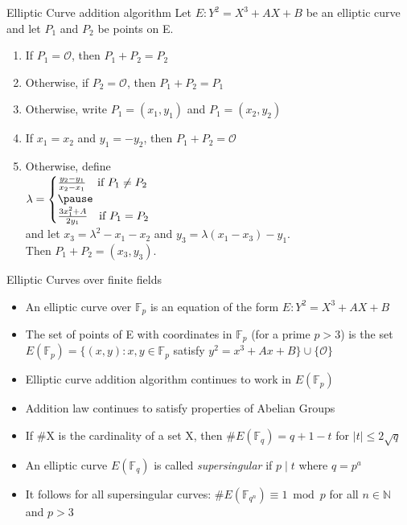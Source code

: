 \documentclass{beamer}
\begin{document}
\begin{frame}{Elliptic Curve addition algorithm}
	Let $E : Y^2 = X^3 + AX + B$ be an elliptic curve and let $P_1$ and $P_2$ be points on E.
	\begin{enumerate}[1.]
		\item If $P_1 = \mathcal{O}$, then $P_1 + P_2 = P_2$\pause
		\item Otherwise, if $P_2=\mathcal{O}$, then $P_1 + P_2 = P_1$\pause
		\item Otherwise, write $P_1 = (x_1,y_1)$ and $P_1 = (x_2,y_2)$\pause
		\item If $x_1 = x_2$ and $y_1=-y_2$, then $P_1+P_2=\mathcal{O}$\pause
		\item Otherwise, define \\
		\qquad \qquad \qquad$\lambda =
		\begin{cases}
			\frac{y_2-y_1}{x_2-x_1}\text{\quad if }P_1 \neq P_2\\\pause
			\\
			\frac{3x_1^2 +A}{2y_1}\text{\quad if }P_1=P_2 
		\end{cases}$\\\pause
		\vspace{5mm}
		and let $x_3=\lambda^2-x_1-x_2$  \hfill and $y_3=\lambda(x_1-x_3)-y_1$.\\
		\vfill
		Then $P_1+P_2=(x_3,y_3)$.
	\end{enumerate}
\end{frame}


\begin{frame}{Elliptic Curves over finite fields}
	\begin{itemize}[\textbullet]
		\item An elliptic curve over $\mathbb{F}_p$ is an equation of the form $E:Y^2=X^3+AX+B$\pause
		\item The set of points of E with coordinates in $\mathbb{F}_p$ (for a prime $p>3$) is the set $E(\mathbb{F}_p)=\{(x,y):x,y\in \mathbb{F}_p$ satisfy $y^2=x^3+Ax+B \} \cup \{\mathcal{O}\}$\pause
		\item Elliptic curve addition algorithm continues to work in $E(\mathbb{F}_p)$\pause
		\item Addition law continues to satisfy properties of Abelian Groups\pause
		\item If \#X is the cardinality of a set X, then \#$E(\mathbb{F}_q) = q+1-t$ for $|t|\leq 2\sqrt{q}$\pause
		\item An elliptic curve $E(\mathbb{F}_q)$ is called \textit{supersingular} if $p \mid t$ where $q=p^a$\pause
		\item It follows for all supersingular curves: $\#E(\mathbb{F}_{q^n})\equiv 1 \bmod p$ for all $n\in \mathbb{N}$ and $p>3$ %
	\end{itemize}
	
\end{frame}
\end{document}
